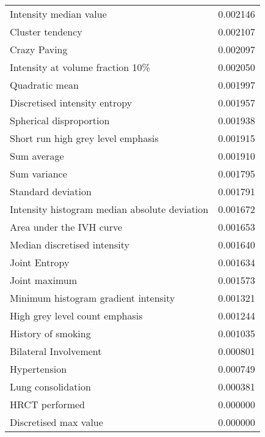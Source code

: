 \begin{longtable}{|lr|}
Intensity median value                             &        0.002146 \\
Cluster tendency                                   &        0.002107 \\
Crazy Paving                                       &        0.002097 \\
Intensity at volume fraction 10\%                   &        0.002050 \\
Quadratic mean                                     &        0.001997 \\
Discretised intensity entropy                      &        0.001957 \\
Spherical disproportion                            &        0.001938 \\
Short run high grey level emphasis                 &        0.001915 \\
Sum average                                        &        0.001910 \\
Sum variance                                       &        0.001795 \\
Standard deviation                                 &        0.001791 \\
Intensity histogram median absolute deviation      &        0.001672 \\
Area under the IVH curve                           &        0.001653 \\
Median discretised intensity                       &        0.001640 \\
Joint Entropy                                      &        0.001634 \\
Joint maximum                                      &        0.001573 \\
Minimum histogram gradient intensity               &        0.001321 \\
High grey level count emphasis                     &        0.001244 \\
History of smoking                                 &        0.001035 \\
Bilateral Involvement                              &        0.000801 \\
Hypertension                                       &        0.000749 \\
Lung consolidation                                 &        0.000381 \\
HRCT performed                                     &        0.000000 \\
Discretised max value                              &        0.000000 \\

\end{longtable}
